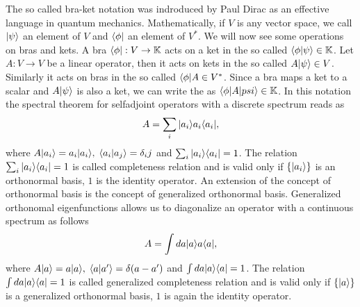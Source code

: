 \documentclass[../1.tex]{subfiles}
\begin{document}
   
    {\color{blue} The so called bra-ket notation was indroduced by Paul Dirac as an effective language in quantum mechanics.
    Mathematically, if $V$ is any vector space, we call  $| \psi \rangle$ an element of $V$ and  $\langle \phi |$ an element of $V^*$.
    We will now see some operations on bras and kets.
    A bra $\langle \phi | : V \to \mathbb{K}$ acts on a ket in the so called  $\langle \phi | \psi \rangle \in \mathbb{K}$.
    Let $A : V \to V$ be a linear operator, then it acts on kets in the so called  $A| \psi \rangle \in V$.
    Similarly it acts on bras in the so called  $\langle \phi |A \in V^*$.
    Since a bra maps a ket to a scalar and $A| \psi \rangle$ is also a ket, we can write the  as $\langle \phi |A| psi \rangle \in \mathbb{K}$.}
    In this notation the spectral theorem for selfadjoint operators with a discrete spectrum reads as
    \[ A = \sum_i | a_i \rangle a_i\langle a_i |, \]
    where $A | a_i \rangle = a_i | a_i \rangle, \; \langle a_i | a_j \rangle = \delta_ij$ and $\sum_i | a_i \rangle \langle a_i | = 1$.
    The relation $\sum_i | a_i \rangle \langle a_i | = 1$ is called completeness relation and
    is valid only if $\{ | a_i \rangle\}$ is an orthonormal basis, $1$ is the identity operator.
    An extension of the concept of orthonormal basis is the concept of generalized orthonormal basis.
    Generalized orthonomal eigenfunctions allows us to diagonalize an operator with a continuous spectrum as follows
    \[ A = \int da | a \rangle a\langle a |, \]
    where $A | a \rangle = a| a \rangle, \; \langle a | a' \rangle = \delta(a-a')$ and $\int da | a \rangle \langle a | = 1$.
    The relation $\int da | a \rangle \langle a | = 1$ is called generalized completeness relation and
    is valid only if $\{ | a \rangle\}$ is a generalized orthonormal basis, $1$ is again the identity operator.
\end{document}

